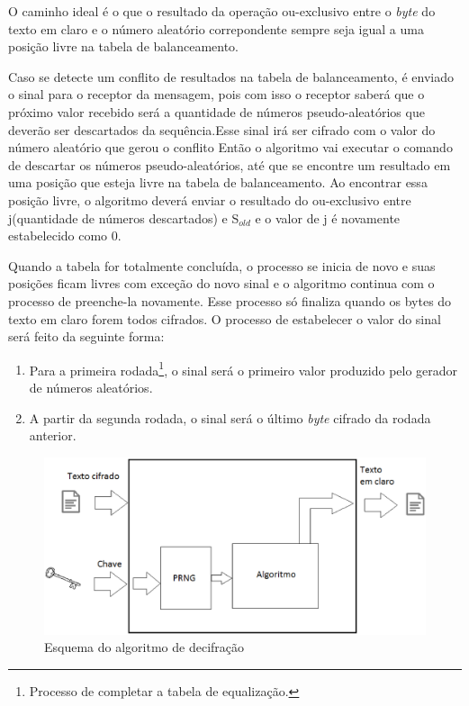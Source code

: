 O caminho ideal é o que o resultado da operação ou-exclusivo entre o \textit{byte} do texto em claro e o número aleatório correpondente sempre seja igual a uma posição livre na tabela de balanceamento.

Caso se detecte um conflito de resultados na tabela de balanceamento, é enviado o sinal para o receptor da mensagem, pois com isso o receptor saberá que o próximo valor recebido será a quantidade de números pseudo-aleatórios que deverão ser descartados da sequência.Esse sinal irá ser cifrado com o valor do número aleatório que gerou o conflito Então o algoritmo vai executar o comando de descartar os números pseudo-aleatórios, até que se encontre um resultado em uma posição que esteja livre na tabela de balanceamento. Ao encontrar essa posição livre, o algoritmo deverá enviar o resultado do ou-exclusivo entre j(quantidade de números descartados) e S$_{old}$ e o valor de j é novamente estabelecido como 0.

Quando a tabela for totalmente concluída, o processo se inicia de novo e suas posições ficam livres com exceção do novo sinal e o algoritmo continua com o processo de preenche-la novamente. Esse processo só finaliza quando os bytes do texto em claro forem todos cifrados. O processo de estabelecer o valor do sinal será feito da seguinte forma:

\begin{enumerate}
	\item Para a primeira rodada\footnote{Processo de completar a tabela de equalização.}, o sinal será o primeiro valor produzido pelo gerador de números aleatórios.
	\item A partir da segunda rodada, o sinal será o último \textit{byte} cifrado da rodada anterior. 
\end{enumerate}

\begin{figure}[h]
	\centering
	\includegraphics[scale=0.6]{figuras/metodo_de_decifra.eps}
	\caption{Esquema do algoritmo de decifração}
\end{figure}

